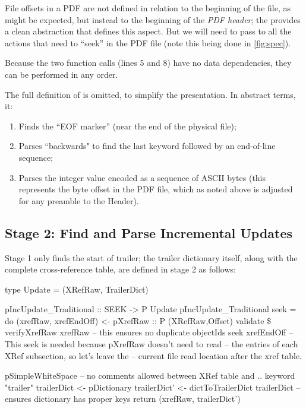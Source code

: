 File offsets in a PDF are not defined in relation to the beginning of
the file, as might be expected, but instead to the beginning of the
\emph{PDF header};
%
the  provides a clean abstraction that defines this
aspect.
%
But we will need to pass  to all the actions that need to
``seek'' in the PDF file (note this being done in \cref{fig:spec}).

Because the two function calls (lines 5 and 8) have no data
dependencies, they can be performed in any order.
%

The full definition of  is
omitted, to simplify the presentation.
%
In abstract terms, it:
\begin{enumerate}
\item Finds the ``EOF marker''  (near the end of the physical
  file);
\item Parses ``backwards" to find the last  keyword
  followed by an end-of-line sequence;
\item Parses the integer value encoded as a sequence of ASCII bytes
  (this represents the byte offset in the PDF file, which as noted
  above is adjusted for any preamble to the Header).
\end{enumerate}

\subsection{Stage 2: Find and Parse Incremental Updates}
\label{sec:stage-2}
%
Stage 1 only finds the start of trailer;
%
the trailer dictionary itself, along with the complete cross-reference table, are defined in stage 2 as follows:
%
\lstset{numbers=right}
\begin{code}
type Update = (XRefRaw, TrailerDict)

pIncUpdate_Traditional :: SEEK -> P Update
pIncUpdate_Traditional seek =
    do
    (xrefRaw, xrefEndOff) <- pXrefRaw :: P (XRefRaw,Offset)
    validate \$
      verifyXrefRaw xrefRaw
        -- this ensures no duplicate objectIds
    seek xrefEndOff
       -- This seek is needed because pXrefRaw doesn't need to read
       -- the entries of each XRef subsection, so let's leave the
       -- current file read location after the xref table.

    pSimpleWhiteSpace -- no comments allowed between XRef table and ..
    keyword "trailer"
    trailerDict  <- pDictionary
    trailerDict' <- dictToTrailerDict trailerDict
                    -- ensures dictionary has proper keys
    return (xrefRaw, trailerDict')
\end{code}
\lstset{numbers=none}

